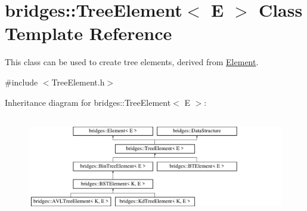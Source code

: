 \hypertarget{classbridges_1_1_tree_element}{}\section{bridges\+::Tree\+Element$<$ E $>$ Class Template Reference}
\label{classbridges_1_1_tree_element}


This class can be used to create tree elements, derived from \mbox{\hyperlink{classbridges_1_1_element}{Element}}.  




{\ttfamily \#include $<$Tree\+Element.\+h$>$}

Inheritance diagram for bridges\+::Tree\+Element$<$ E $>$\+:\begin{figure}[H]
\begin{center}
\leavevmode
\includegraphics[height=4.402516cm]{classbridges_1_1_tree_element}
\end{center}
\end{figure}
